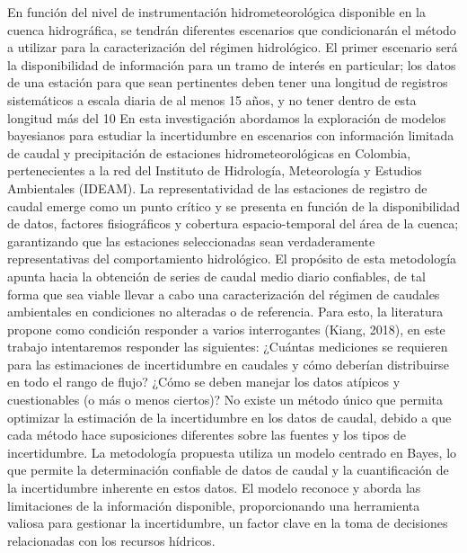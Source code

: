 \documentclass{article}
\begin{document}
{En función del nivel de instrumentación hidrometeorológica disponible en la cuenca hidrográfica, se tendrán diferentes escenarios que condicionarán el método a utilizar para la caracterización del régimen hidrológico. El primer escenario será la disponibilidad de información para un tramo de interés en particular; los datos de una estación para que sean pertinentes deben tener una longitud de registros sistemáticos a escala diaria de al menos 15 años, y no tener dentro de esta longitud más del 10%
En esta investigación abordamos la exploración de modelos bayesianos para estudiar la incertidumbre en escenarios con información limitada de caudal y precipitación de estaciones hidrometeorológicas en Colombia, pertenecientes a la red del Instituto de Hidrología, Meteorología y Estudios Ambientales (IDEAM). La representatividad de las estaciones de registro de caudal emerge como un punto crítico y se presenta en función de la disponibilidad de datos, factores fisiográficos y cobertura espacio-temporal del área de la cuenca; garantizando que las estaciones seleccionadas sean verdaderamente representativas del comportamiento hidrológico.
El propósito de esta metodología apunta hacia la obtención de series de caudal medio diario confiables, de tal forma que sea viable llevar a cabo una caracterización del régimen de caudales ambientales en condiciones no alteradas o de referencia. Para esto, la literatura propone como condición responder a varios interrogantes (Kiang, 2018), en este trabajo intentaremos responder las siguientes: 
¿Cuántas mediciones se requieren para las estimaciones de incertidumbre en caudales y cómo deberían distribuirse en todo el rango de flujo?
¿Cómo se deben manejar los datos atípicos y cuestionables (o más o menos ciertos)?
No existe un método único que permita optimizar la estimación de la incertidumbre en los datos de caudal, debido a que cada método hace suposiciones diferentes sobre las fuentes y los tipos de incertidumbre. La metodología propuesta utiliza un modelo centrado en Bayes, lo que permite la determinación confiable de datos de caudal y la cuantificación de la incertidumbre inherente en estos datos. El modelo reconoce y aborda las limitaciones de la información disponible, proporcionando una herramienta valiosa para gestionar la incertidumbre, un factor clave en la toma de decisiones relacionadas con los recursos hídricos.
}
\end{document}

